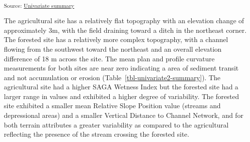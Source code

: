 \documentclass[
  number]{elsarticle}
\begin{document}
\textsubscript{Source:
\href{https://alex-koiter.github.io/spatial-variability-soil-manuscript/notebooks/univariate_summary.qmd.html\#cell-tbl-univariate-summary}{Univariate
summary}}

The agricultural site has a relatively flat topography with an elevation
change of approximately 3m, with the field draining toward a ditch in
the northeast corner. The forested site has a relatively more complex
topography, with a channel flowing from the southwest toward the
northeast and an overall elevation difference of 18 m across the site.
The mean plan and profile curvature measurements for both sites are near
zero indicating a area of sediment transit and not accumulation or
erosion (Table~\ref{tbl-univariate2-summary}). The agricultural site had
a higher SAGA Wetness Index but the forested site had a larger range in
values and exhibited a higher degree of variability. The forested site
exhibited a smaller mean Relative Slope Position value (streams and
depressional areas) and a smaller Vertical Distance to Channel Network,
and for both terrain attributes a greater variability as compared to the
agricultural reflecting the presence of the stream crossing the forested
site.
\end{document}
